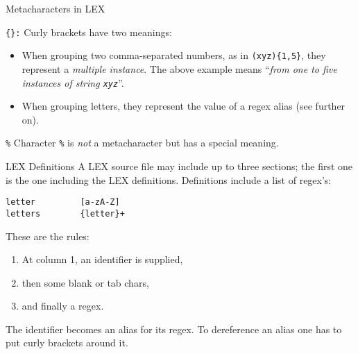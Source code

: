 \begin{frame}[fragile]{Metacharacters in LEX}

\begin{description}
\item{\tt \{\}:} Curly brackets have two meanings:
        \begin{itemize}
        \item When grouping two comma-separated numbers, as in
        {\tt (xyz)\{1,5\}}, they represent a {\em multiple instance}.
	The above example means 
        ``{\em from one to five instances of
        string {\tt xyz}}''.
        \item When grouping letters, they represent the value of a
	regex alias (see further on).
        \end{itemize}

\item{\tt \%} Character {\tt \%} is {\em not\/} a metacharacter but has a special
meaning.
\end{description}


\end{frame}
\begin{frame}[fragile]{LEX Definitions}
A LEX source file may include up to three sections; the first
one is the one including the LEX definitions. Definitions include
a list of regex's:
\begin{verbatim}
letter         [a-zA-Z]
letters        {letter}+
\end{verbatim}


\vspace{20pt}

These are the rules:
\begin{enumerate}
\item At column 1, an identifier is supplied,
\item then some blank or tab chars,
\item and finally a regex.
\end{enumerate}


\vspace{20pt}

The identifier becomes an alias for its regex.
To dereference an alias one has to put curly brackets around it.



\end{frame}
